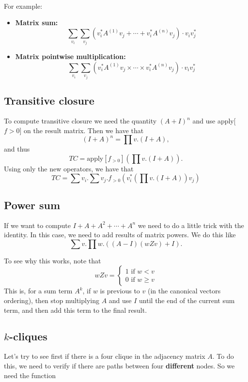For example:

\begin{itemize}
	\item \textbf{Matrix sum:}$$\sum_{v_i}\sum_{v_j}\left( v_i^*A^{(1)}v_j+ \cdots + v_i^*A^{(n)}v_j\right)\cdot v_iv_j^*$$
	\item \textbf{Matrix pointwise multiplication:} $$\sum_{v_i}\sum_{v_j}\left( v_i^*A^{(1)}v_j\times \cdots\times v_i^*A^{(n)}v_j\right)\cdot v_iv_j^*$$
\end{itemize}

\subsection*{Transitive closure}

To compute transitive closure we need the quantity $(A+I)^n$ and use apply[$f>0$] on the result matrix. Then we have that $$(I+A)^n=\prod v. (I+A),$$ and thus $$TC = \text{apply}\left[ f_{>0}\right]\left( \prod v. (I+A) \right).$$
Using only the new operators, we have that $$TC=\sum v_i. \sum v_j. f_{>0}\left(v_i^*\left(\prod v. (I+A)\right)v_j\right)$$

\subsection*{Power sum}

If we want to compute $I+ A + A^2 + \cdots + A^n$ we need to do a little trick with the identity. In this case, we need to add results of matrix powers. We do this like $$\sum v.\prod w. \left( (A-I)(wZv) + I\right).$$

To see why this works, note that
\[
  			wZv=\begin{cases}
               1 \text{ if } w<v \\
               0 \text{ if } w\geq v
            \end{cases}
		\]
This is, for a sum term $A^k$, if $w$ is previous to $v$ (in the canonical vectors ordering), then stop multiplying $A$ and use $I$ until the end of the current sum term, and then add this term to the final result.

\subsection*{$k$-cliques}

Let's try to see first if there is a four clique in the adjacency matrix $A$. To do this, we need to verify if there are paths between four \textbf{different} nodes. So we need the function 

